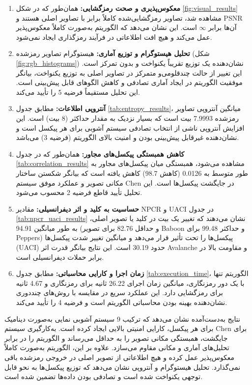 \documentclass[a4paper,12pt]{report}
\renewcommand{\%}{\lr{\oldpercent}}
\providecommand{\lr}[1]{#1}
\begin{document}
\begin{enumerate}
    \item \textbf{معکوس‌پذیری و صحت رمزگشایی:} همان‌طور که در شکل \ref{fig:visual_results} مشاهده شد، تصاویر رمزگشایی‌شده کاملاً برابر با تصاویر اصلی هستند و \lr{PSNR} آن‌ها برابر $\infty$ است. این نشان می‌دهد که الگوریتم به‌صورت کاملاً معکوس‌پذیر عمل می‌کند و هیچ افت اطلاعاتی در فرآیند رمزگذاری ایجاد نمی‌شود.
    \item \textbf{تحلیل هیستوگرام و توزیع آماری:} هیستوگرام تصاویر رمزشده (شکل \ref{fig:rgb_histograms}) نشان‌دهنده یک توزیع تقریباً یکنواخت و بدون تمرکز است. این تغییر از حالت چندقلومی‌و متمرکز در تصاویر اصلی به توزیع یکنواخت، بیانگر موفقیت الگوریتم در ایجاد آماری تصادفی و کاهش الگوهای قابل پیش‌بینی است. این تحلیل مستقیماً فرضیه 5 را تأیید می‌کند.
    \item \textbf{آنتروپی اطلاعات:} مطابق جدول \ref{tab:entropy_results}، میانگین آنتروپی تصاویر رمزشده 7.9993 بیت است که بسیار نزدیک به مقدار حداکثر (8 بیت) است. این افزایش آنتروپی ناشی از انتخاب تصادفی سیستم آشوبی برای هر پیکسل است و نشان‌دهنده غیرقابل پیش‌بینی بودن و امنیت بالای الگوریتم (فرضیه 3) می‌باشد.
    \item \textbf{کاهش همبستگی پیکسل‌های مجاور:} همان‌طور که در جدول \ref{tab:correlation_results} مشاهده می‌شود، همبستگی میان پیکسل‌های مجاور به طور متوسط به 0.0126 (کاهش 98.7\%) کاهش یافته است که بیانگر شکستن ساختار مکانی تصویر و عملکرد موفق سیستم \lr{Chen} در جایگشت پیکسل‌ها است. این تحلیل تأیید قاطع فرضیه 2 محسوب می‌شود.
    \item \textbf{حساسیت به کلید و اثر دیفرانسیلی:} مقادیر \lr{NPCR} و \lr{UACI} در جدول \ref{tab:npcr_uaci_results} نشان می‌دهند که تغییر یک بیت در کلید یا تصویر اصلی، به طور میانگین \lr{94.91\%} (و حداقل \lr{82.76\%} برای تصویر \lr{Baboon} و حداکثر \lr{99.48\%} برای \lr{Peppers}) پیکسل‌ها را تحت تأثیر قرار می‌دهد و میانگین تغییر شدت پیکسل‌ها (\lr{UACI}) حدود \lr{30.19\%} است. این نتایج بیانگر قدرت اثر \lr{Avalanche} و مقاومت بالا در برابر حملات دیفرانسیلی است.
    \item \textbf{زمان اجرا و کارایی محاسباتی:} مطابق جدول \ref{tab:execution_time}، الگوریتم تنها با یک دور رمزنگاری، میانگین زمان اجرای 26.22 ثانیه برای رمزنگاری و 4.67 ثانیه برای رمزگشایی دارد. این عملکرد سریع در مقایسه با روش‌های چنددوری نشان‌دهنده بهینه بودن محاسباتی الگوریتم است و فرضیه 4 را تأیید می‌کند.
\end{enumerate}

نتایج به‌دست‌آمده نشان می‌دهد که ترکیب 9 سیستم آشوبی نمایی به‌صورت دینامیک برای هر پیکسل، کارایی امنیتی بالایی ایجاد کرده است. به‌کارگیری سیستم \lr{Chen} برای جایگشت، همبستگی مکانی تصویر را به حداقل می‌رساند و الگوریتم را در برابر تحلیل‌های آماری و مکانی مقاوم می‌سازد. علاوه بر این، الگوریتم به‌صورت کاملاً معکوس‌پذیر عمل کرده و هیچ اطلاعاتی از تصویر اصلی در خروجی رمزشده باقی نمی‌گذارد. تحلیل هیستوگرام و آنتروپی نشان می‌دهد که توزیع پیکسل‌ها به نحو قابل توجهی یکنواخت شده است و تصادفی بودن داده‌ها تضمین شده است.
\end{document}
